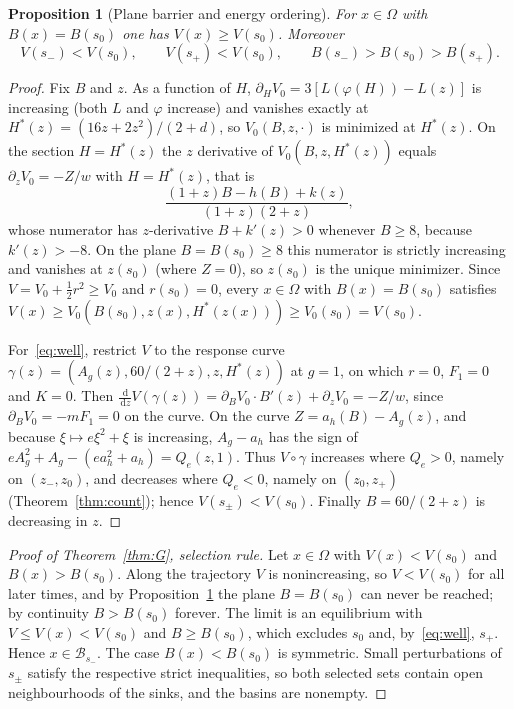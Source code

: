 \documentclass[11pt,a4paper]{article}
\theoremstyle{plain}
\newtheorem{proposition}[theorem]{Proposition}
\theoremstyle{definition}
\theoremstyle{remark}
\newcommand{\B}{\mathcal{B}}
\newcommand{\dd}{\,\mathrm{d}}
\begin{document}
\begin{proposition}[Plane barrier and energy ordering]\label{prop:barrier}
For $x\in\Omega$ with $B(x)=B(s_0)$ one has $V(x)\ge V(s_0)$. Moreover
\begin{equation}\label{eq:well}
V(s_-)<V(s_0),\qquad V(s_+)<V(s_0),\qquad B(s_-)>B(s_0)>B(s_+).
\end{equation}
\end{proposition}
\begin{proof}
Fix $B$ and $z$. As a function of $H$, $\partial_HV_0=3[L(\varphi(H))-L(z)]$ is increasing (both $L$ and $\varphi$ increase) and vanishes exactly at $H^*(z)=(16z+2z^2)/(2+d)$, so $V_0(B,z,\cdot)$ is minimized at $H^*(z)$. On the section $H=H^*(z)$ the $z$ derivative of $V_0(B,z,H^*(z))$ equals $\partial_zV_0=-Z/w$ with $H=H^*(z)$, that is
\[
\frac{(1+z)B-h(B)+k(z)}{(1+z)(2+z)} ,
\]
whose numerator has $z$-derivative $B+k'(z)>0$ whenever $B\ge8$, because $k'(z)>-8$. On the plane $B=B(s_0)\ge8$ this numerator is strictly increasing and vanishes at $z(s_0)$ (where $Z=0$), so $z(s_0)$ is the unique minimizer. Since $V=V_0+\tfrac12r^2\ge V_0$ and $r(s_0)=0$, every $x\in\Omega$ with $B(x)=B(s_0)$ satisfies $V(x)\ge V_0(B(s_0),z(x),H^*(z(x)))\ge V_0(s_0)=V(s_0)$.

For~\eqref{eq:well}, restrict $V$ to the response curve $\gamma(z)=(A_g(z),60/(2+z),z,H^*(z))$ at $g=1$, on which $r=0$, $F_1=0$ and $K=0$. Then $\frac{\dd}{\dd z}V(\gamma(z))=\partial_BV_0\cdot B'(z)+\partial_zV_0=-Z/w$, since $\partial_BV_0=-mF_1=0$ on the curve. On the curve $Z=a_h(B)-A_g(z)$, and because $\xi\mapsto e\xi^2+\xi$ is increasing, $A_g-a_h$ has the sign of $eA_g^2+A_g-(ea_h^2+a_h)=Q_e(z,1)$. Thus $V\circ\gamma$ increases where $Q_e>0$, namely on $(z_-,z_0)$, and decreases where $Q_e<0$, namely on $(z_0,z_+)$ (Theorem~\ref{thm:count}); hence $V(s_\pm)<V(s_0)$. Finally $B=60/(2+z)$ is decreasing in $z$.
\end{proof}

\begin{proof}[Proof of Theorem~\ref{thm:G}, selection rule]
Let $x\in\Omega$ with $V(x)<V(s_0)$ and $B(x)>B(s_0)$. Along the trajectory $V$ is nonincreasing, so $V<V(s_0)$ for all later times, and by Proposition~\ref{prop:barrier} the plane $B=B(s_0)$ can never be reached; by continuity $B>B(s_0)$ forever. The limit is an equilibrium with $V\le V(x)<V(s_0)$ and $B\ge B(s_0)$, which excludes $s_0$ and, by~\eqref{eq:well}, $s_+$. Hence $x\in\B_{s_-}$. The case $B(x)<B(s_0)$ is symmetric. Small perturbations of $s_\pm$ satisfy the respective strict inequalities, so both selected sets contain open neighbourhoods of the sinks, and the basins are nonempty.
\end{proof}
\end{document}
